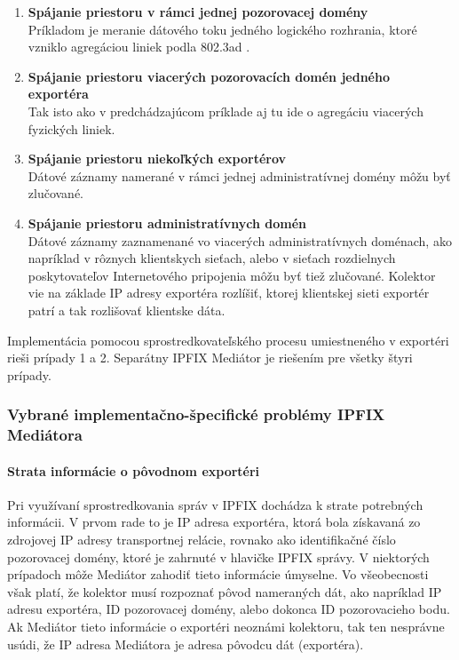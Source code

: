 \begin{enumerate}
 \item \textbf{Spájanie priestoru v rámci jednej pozorovacej domény} \\ 
    Príkladom je meranie dátového toku jedného logického rozhrania, ktoré vzniklo agregáciou liniek 
    podla 802.3ad \citep{ieee802.3}.
 \item \textbf{Spájanie priestoru viacerých pozorovacích domén jedného exportéra} \\
    Tak isto ako v predchádzajúcom príklade aj tu ide o agregáciu viacerých fyzických liniek. 
 \item \textbf{Spájanie priestoru niekoľkých exportérov} \\
    Dátové záznamy namerané v rámci jednej administratívnej domény môžu byť zlučované.
 \item \textbf{Spájanie priestoru administratívnych domén} \\
    Dátové záznamy zaznamenané vo viacerých administratívnych doménach, ako napríklad v rôznych klientskych 
    sieťach, alebo v sieťach rozdielnych poskytovateľov Internetového pripojenia môžu byť tiež zlučované.
    Kolektor vie na základe IP adresy exportéra rozlíšiť, ktorej klientskej sieti exportér patrí a tak 
    rozlišovať klientske dáta.
\end{enumerate}

Implementácia pomocou sprostredkovateľského procesu umiestneného v exportéri rieši prípady 1 a 2. 
Separátny IPFIX Mediátor je riešením pre  všetky štyri prípady.


\subsubsection{Vybrané implementačno-špecifické problémy IPFIX Mediátora} \label{sec:problems}


\paragraph{Strata informácie o pôvodnom exportéri} \label{sec:loss_info}

Pri využívaní sprostredkovania správ v IPFIX dochádza k strate potrebných informácii. V prvom rade to je 
IP adresa exportéra, ktorá bola získavaná zo zdrojovej IP adresy transportnej relácie, rovnako 
ako identifikačné číslo pozorovacej domény, ktoré je zahrnuté v hlavičke IPFIX správy.
V niektorých prípadoch môže Mediátor zahodiť tieto informácie úmyselne. 
Vo všeobecnosti však platí, že kolektor musí rozpoznať pôvod nameraných dát, ako napríklad IP adresu 
exportéra, ID pozorovacej domény, alebo dokonca ID pozorovacieho bodu. Ak Mediátor tieto informácie 
o exportéri neoznámi kolektoru, tak ten nesprávne usúdi, že IP adresa Mediátora je adresa pôvodcu dát 
(exportéra).

